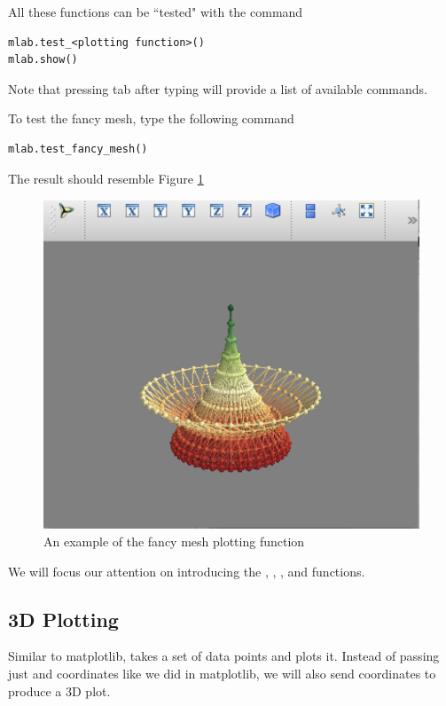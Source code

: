 All these functions can be ``tested" with the command
\begin{lstlisting}
mlab.test_<plotting function>()
mlab.show()
\end{lstlisting}
Note that pressing tab after typing  will provide a 
list of available commands. 

To test the fancy mesh, type the following command
\begin{lstlisting}
mlab.test_fancy_mesh()
\end{lstlisting}

The result should resemble Figure \ref{mayavi:fancymesh}

\begin{figure} 
\includegraphics[width=\textwidth]{fancymesh.pdf}
\caption{An example of the fancy mesh plotting function} 
\label{mayavi:fancymesh}
\end{figure}


We will focus our attention on introducing the , , 
, and  functions. 


\subsection*{3D Plotting} Similar to matplotlib,  takes a set
of data points and plots it. Instead of passing just  and 
coordinates like we did in matplotlib, we will also send 
coordinates to produce a 3D plot. 

